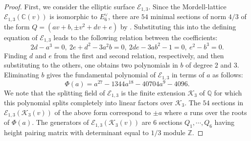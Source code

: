 \documentclass[11pt]{amsart}
\newcommand{\Z}{{\mathbb Z}}
\newcommand{\Q}{{\mathbb Q}}
\newcommand{\CC}{{\mathbb C}}
\newcommand{\Ee}{{\mathcal E}}
\newcommand{\KK}{{\mathcal K}}
\numberwithin{equation}{section}
\numberwithin{table}{section}
\newcommand\<{\langle}
\begin{document}
\begin{proof}
	First, we consider  the elliptic surface $\Ee_{1,3}$.
	Since the Mordell-lattice $\Ee_{1,3}(\CC(v))$ is isomorphic to  $E_6^\vee$, 
	there are $54$ minimal sections of norm $4/3$ of the  form
	$Q=(a v+b , \pm v^2+ d v +e)$ by   \cite[Theorem 10.5]{Shioda1991d}. 
	Substituting this into the defining equation of $\Ee_{1,3}$ leads to the following relation between the coefficients:
	\begin{equation}
		\label{rel4}
		2 d-a^3 =0, \  2 e+ d^2 -3 a^2 b = 0, \
		2 d e - 3 a b^2 -1  =0, \  e^2-b^3 =0.
	\end{equation}
	Finding $d$ and $e$ from the first and second relation, respectively,  and then substituting to the others, 
	one obtains two polynomials in $b$ of degree $2$ and $3$. Eliminating  $b$ gives the fundamental polynomial of  $\Ee_{1,3}$ in terms of $a$ as follows:
	\begin{equation}
		\Phi(a)= a^{27} - 1344 a^{18} - 40704 a^9 - 4096.
	\end{equation}
	We note that the splitting field  of $\Ee_{1,3}$  is the finite extension $\KK_3$ of $\Q$ for which  this polynomial  splits completely into linear factors over $\KK_3$. The  $54$ sections in $\Ee_{1,3}(\KK_3(v))$ of the above form correspond to $\pm a$ where $a$ runs over  the roots of $\Phi(a)$.  The generators of $\Ee_{1,3}(\KK_3(v))$ are $6$ sections  $Q_1,\cdots, Q_6$ having height pairing matrix with determinant
	equal to $1/3$ module $\Z$.
	

\end{proof}
\end{document}
